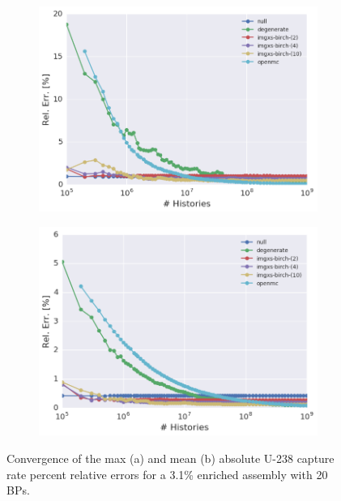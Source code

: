 \begin{figure}[h!]
\centering
\begin{subfigure}{\textwidth}
  \centering
  \includegraphics[width=0.9\linewidth]{figures/results/convergence/assm-31-20BPs/max-capt-err-evo}
  \caption{}
  \label{fig:chap11-assm-3.1-20BPs-capture-converge-max}
\end{subfigure}
\begin{subfigure}{\textwidth}
  \centering
  \includegraphics[width=0.9\linewidth]{figures/results/convergence/assm-31-20BPs/mean-capt-err-evo}
  \caption{}
  \label{fig:chap11-assm-3.1-20BPs-capture-converge-mean}
\end{subfigure}
\vspace{2mm}
\caption[Fission rate covergence for a 3.1\% enriched assembly with 20 \acp{BP}]{Convergence of the max (a) and mean (b) absolute U-238 capture rate percent relative errors for a 3.1\% enriched assembly with 20 \acp{BP}.}
\label{fig:chap11-assm-3.1-20BPs-capture-converge}
\end{figure}

